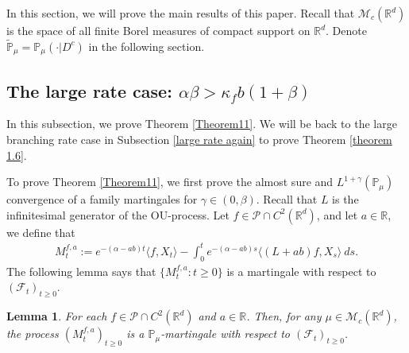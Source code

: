 \documentclass[12pt,a4paper]{amsart}
\theoremstyle{plain}
\newtheorem{lem}[thm]{Lemma}
\theoremstyle{definition}
\numberwithin{equation}{section}
\begin{document}
In this section, we will prove the main results of this paper. Recall that $\mathcal{M}_c(\mathbb{R}^d)$ is the space of all finite Borel measures of compact support on $\mathbb{R}^d$. Denote  $\mathbb{\tilde{P}}_{\mu}=\mathbb{P}_{\mu}(\cdot|D^c)$ in the following section.

\subsection{The large rate case: $\alpha \beta > \kappa_f b (1+\beta)$}

In this subsection, we prove Theorem \ref{Theorem11}. We will be back to the large branching rate case in Subsection \ref{large rate again} to prove Theorem \ref{theorem 1.6}.

To prove Theorem \ref{Theorem11}, we first prove the almost sure and $L^{1+\gamma}(\mathbb{P}_{\mu})$ convergence of a family martingales for $\gamma\in (0, \beta)$. Recall that $L$ is the infinitesimal generator of the OU-process. Let $f\in \mathcal{P}\cap C^2(\mathbb R^d)$, and let $a\in \mathbb R$, we define that
\begin{equation}\begin{split}
\label{defmartingale}
    M_t^{f,a}:=e^{-(\alpha-ab)t}\langle f,X_t\rangle-\int_0^t e^{-(\alpha-ab)s}\langle (L+ab)f, X_s\rangle~ ds.
\end{split}\end{equation}
    The following lemma says that $\{M_t^{f,a}: t\geq 0\}$ is a martingale with respect to $(\mathscr{F}_t)_{t\geq 0}$.
\begin{lem}
\label{lemma25}
    For each $f\in \mathcal{P}\cap C^2(\mathbb R^d)$ and $a\in \mathbb R$.
Then, for any $\mu\in \mathcal M_c(\mathbb R^d)$, the process $(M_t^{f,a})_{t\geq 0}$ is a $\mathbb P_\mu$-martingale with respect to $(\mathscr F_t)_{t\geq 0}$.
\end{lem}
\end{document}
